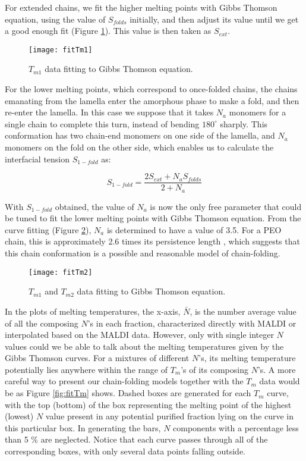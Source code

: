 For extended chains, we fit the higher melting points with Gibbs Thomson equation, using the value of $S_{folds}$ initially, and then adjust its value until we get a good enough fit (Figure \ref{fig:fitTm1}). This value is then taken as $S_{ext}$.

\begin{figure}[H]
\center
\vspace{1 cm}
\texttt{[image: fitTm1]}
\caption{$T_{m1}$ data fitting to Gibbs Thomson equation.}
\label{fig:fitTm1}
\end{figure}

For the lower melting points, which correspond to once-folded chains, the chains emanating from the lamella enter the amorphous phase to make a fold, and then re-enter the lamella. In this case we suppose that it takes $N_{a}$ monomers for a single chain to complete this turn, instead of bending $180^\circ$ sharply. This conformation has two chain-end monomers on one side of the lamella, and $N_{a}$ monomers on the fold on the other side, which enables us to calculate the interfacial tension $S_{1-fold}$ as:

\begin{equation}
\label{eqn_S1fold}
S_{1-fold} = \dfrac{2S_{ext} + N_{a} S_{folds}}{2 + N_{a}}
\end{equation}

With $S_{1-fold}$ obtained, the value of $N_{a}$ is now the only free parameter that could be tuned to fit the lower melting points with Gibbs Thomson equation. From the curve fitting (Figure \ref{fig:fitTm2}), $N_{a}$ is determined to have a value of 3.5. For a PEO chain, this is approximately 2.6 times its persistence length \cite{Takahashi1973}, which suggests that this chain conformation is a possible and reasonable model of chain-folding.

\begin{figure}[H]
\center
\vspace{1 cm}
\texttt{[image: fitTm2]}
\caption{$T_{m1}$ and $T_{m2}$ data fitting to Gibbs Thomson equation.}
\label{fig:fitTm2}
\end{figure}

In the plots of melting temperatures, the x-axis, $\bar{N}$, is the number average value of all the composing $N$'s in each fraction, characterized directly with MALDI or interpolated based on the MALDI data. However, only with single integer $N$ values could we be able to talk about the melting temperatures given by the Gibbs Thomson curves. For a mixtures of different $N$'s, its melting temperature potentially lies anywhere within the range of $T_{m}$'s of its composing $N$'s. A more careful way to present our chain-folding models together with the $T_{m}$ data would be as Figure \ref{fig:fitTm} shows. Dashed boxes are generated for each $T_{m}$ curve, with the top (bottom) of the box representing the melting point of the highest (lowest) $N$ value present in any potential purified fraction lying on the curve in this particular box. In generating the bars, $N$ components with a percentage less than 5 \% are neglected. Notice that each curve passes through all of the corresponding boxes, with only several data points falling outside.

